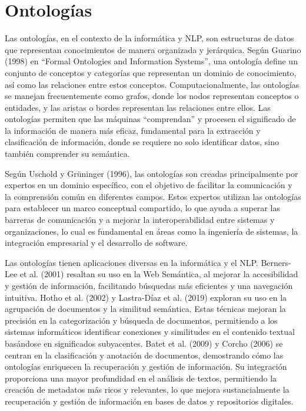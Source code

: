 \section{Ontolog\'ias}

Las ontologías, en el contexto de la informática y NLP, son estructuras de datos que representan conocimientos de manera organizada y jerárquica. Según Guarino (1998) en ``Formal Ontologies and Information Systems'', una ontología define un conjunto de conceptos y categorías que representan un dominio de conocimiento, así como las relaciones entre estos conceptos. Computacionalmente, las ontologías se manejan frecuentemente como grafos, donde los nodos representan conceptos o entidades, y las aristas o bordes representan las relaciones entre ellos. Las ontologías permiten que las máquinas ``comprendan'' y procesen el significado de la información de manera más eficaz, fundamental para la extracción y clasificación de información, donde se requiere no solo identificar datos, sino también comprender su sem\'antica.

Según Uschold y Grüninger (1996), las ontologías son creadas principalmente por expertos en un dominio específico, con el objetivo de facilitar la comunicación y la comprensión común en diferentes campos. Estos expertos utilizan las ontologías para establecer un marco conceptual compartido, lo que ayuda a superar las barreras de comunicación y a mejorar la interoperabilidad entre sistemas y organizaciones, lo cual es fundamental en áreas como la ingeniería de sistemas, la integración empresarial y el desarrollo de software.

Las ontologías tienen aplicaciones diversas en la informática y el NLP. Berners-Lee et al. (2001) resaltan su uso en la Web Semántica, al mejorar la accesibilidad y gestión de información, facilitando búsquedas más eficientes y una navegación intuitiva. Hotho et al. (2002) y Lastra-Díaz et al. (2019) exploran su uso en la agrupación de documentos y la similitud semántica. Estas técnicas mejoran la precisión en la categorización y búsqueda de documentos, permitiendo a los sistemas informáticos identificar conexiones y similitudes en el contenido textual basándose en significados subyacentes. Batet et al. (2009) y Corcho (2006) se centran en la clasificación y anotación de documentos, demostrando cómo las ontologías enriquecen la recuperación y gestión de información. Su integración proporciona una mayor profundidad en el análisis de textos, permitiendo la creación de metadatos más ricos y relevantes, lo que mejora sustancialmente la recuperación y gestión de información en bases de datos y repositorios digitales.

